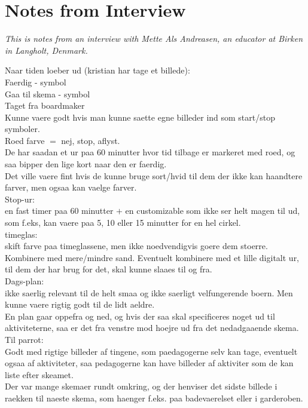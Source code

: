 \section{Notes from Interview}
\label{InterviewMette}
\textit{This is notes from an interview with Mette Als Andreasen, an educator at Birken in Langholt, Denmark.}

Naar tiden loeber ud (kristian har tage et billede):\\
Faerdig - symbol\\
Gaa til skema - symbol\\
Taget fra boardmaker\\

Kunne vaere godt hvis man kunne saette egne billeder ind som start/stop symboler.\\


Roed farve $=$ nej, stop, aflyst.\\

De har saadan et ur paa 60 minutter hvor tid tilbage er markeret med roed, og saa bipper den lige kort naar den er faerdig.\\
  Det ville vaere fint hvis de kunne bruge sort/hvid til dem der ikke kan haandtere farver, men ogsaa kan vaelge farver.\\

Stop-ur:\\
en fast timer paa 60 minutter $+$ en customizable som ikke ser helt magen til ud, som f.eks, kan vaere paa 5, 10 eller 15 minutter for en hel cirkel.\\

timeglas:\\
skift farve paa timeglassene, men ikke noedvendigvis goere dem stoerre. Kombinere med mere/mindre sand. Eventuelt kombinere med et lille digitalt ur, til dem der har brug for det, skal kunne slaaes til og fra.\\

Dags-plan:\\
ikke saerlig relevant til de helt smaa og ikke saerligt velfungerende boern. Men kunne vaere rigtig godt til de lidt aeldre.\\
   En plan gaar oppefra og ned, og hvis der saa skal specificeres noget ud til aktiviteterne, saa er det fra venstre mod hoejre ud fra det nedadgaaende skema.\\

Til parrot:\\
Godt med rigtige billeder af tingene, som paedagogerne selv kan tage, eventuelt ogsaa af aktiviteter, saa pedagogerne kan have billeder af aktiviter som de kan liste efter skeamet.\\

Der var mange skemaer rundt omkring, og der henviser det sidste billede i raekken til naeste skema, som haenger f.eks. paa badevaerelset eller i garderoben.
